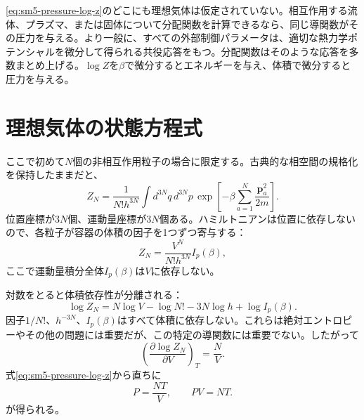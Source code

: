 \eqref{eq:sm5-pressure-log-z}のどこにも理想気体は仮定されていない。相互作用する流体、プラズマ、または固体について分配関数を計算できるなら、同じ導関数がその圧力を与える。より一般に、すべての外部制御パラメータは、適切な熱力学ポテンシャルを微分して得られる共役応答をもつ。分配関数はそのような応答を多数まとめ上げる。\(\log Z\)を\(\beta\)で微分するとエネルギーを与え、体積で微分すると圧力を与える。

\section{理想気体の状態方程式}

ここで初めて\(N\)個の非相互作用粒子の場合に限定する。古典的な相空間の規格化を保持したままだと、
\begin{equation}
 Z_N=
 \frac{1}{N!h^{3N}}
 \int d^{3N}q\,d^{3N}p\,
 \exp\!\left[
 -\beta\sum_{a=1}^{N}\frac{\mathbf p_a^2}{2m}
 \right].
 \label{eq:sm5-ideal-gas-partition-integral}
\end{equation}
位置座標が\(3N\)個、運動量座標が\(3N\)個ある。ハミルトニアンは位置に依存しないので、各粒子が容器の体積の因子を1つずつ寄与する：
\begin{equation}
 Z_N=
 \frac{V^N}{N!h^{3N}}I_p(\beta),
 \label{eq:sm5-ideal-gas-factorization}
\end{equation}
ここで運動量積分全体\(I_p(\beta)\)は\(V\)に依存しない。

\begin{classroomqa}
\end{classroomqa}

対数をとると体積依存性が分離される：
\begin{equation}
 \log Z_N
 =
 N\log V-\log N!-3N\log h+\log I_p(\beta).
 \label{eq:sm5-log-ideal-gas-partition}
\end{equation}
因子\(1/N!\)、\(h^{-3N}\)、\(I_p(\beta)\)はすべて体積に依存しない。これらは絶対エントロピーやその他の問題には重要だが、この特定の導関数には重要でない。したがって
\begin{equation}
 \left(\frac{\partial\log Z_N}{\partial V}\right)_T
 =\frac{N}{V}.
 \label{eq:sm5-log-z-volume-derivative}
\end{equation}
式\eqref{eq:sm5-pressure-log-z}から直ちに
\begin{equation}
 P=\frac{NT}{V},
 \qquad
 \boxed{PV=NT}.
 \label{eq:sm5-ideal-gas-law}
\end{equation}が得られる。

